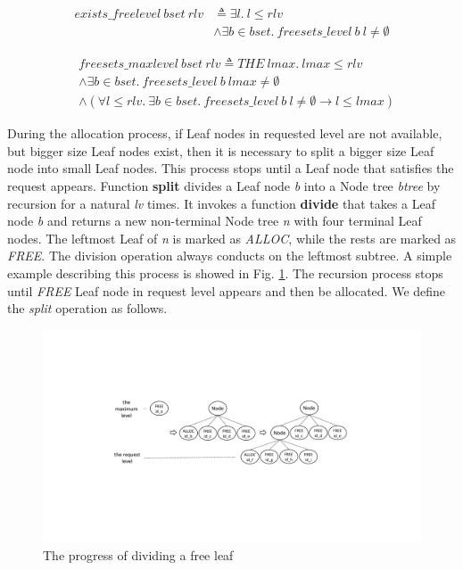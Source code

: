 \begin{definition} 
\end{definition}
\vspace{-7pt}
{\footnotesize
\begin{align*}
exists\_freelevel\ bset\ rlv &\triangleq \exists l.\ l \leq rlv \\
&\wedge \exists b \in bset.\ freesets\_level\ b\ l \ne \emptyset
\end{align*}
}
\vspace{-12pt}

\begin{definition} 
\end{definition}
\vspace{-7pt}	
{\footnotesize
\begin{align*}
&freesets\_maxlevel\ bset\ rlv \triangleq THE\ lmax.\ lmax \leq rlv \\
&\wedge \exists b \in bset.\ freesets\_level\ b\ lmax \neq \emptyset \\
&\wedge (\forall l \leq rlv.\ \exists b \in bset.\ freesets\_level\ b\ l \ne \emptyset \longrightarrow l \leq lmax)
\end{align*}
}
\vspace{-12pt}

During the allocation process, if Leaf nodes in requested level are not available, but bigger size Leaf nodes exist, then it is necessary to split a bigger size Leaf node into small Leaf nodes. This process stops until a Leaf node that satisfies the request appears. Function \textbf{split} divides a Leaf node \emph{b} into a Node tree \emph{btree} by recursion for a natural \emph{lv} times. It invokes a function \textbf{divide} that takes a Leaf node \emph{b} and returns a new non-terminal Node tree \emph{n} with four terminal Leaf nodes. The leftmost Leaf of \emph{n} is marked as \emph{ALLOC}, while the rests are marked as \emph{FREE}. The division operation always conducts on the leftmost subtree. A simple example describing this process is showed in Fig. \ref{fig1}. The recursion process stops until \emph{FREE} Leaf node in request level appears and then be allocated. We define the \emph{split} operation as follows.

\begin{figure}[htbp]
	\centering
	\includegraphics[width=1\textwidth]{fig1.pdf}
	\caption{The progress of dividing a free leaf}
	\label{fig1}
\end{figure}

